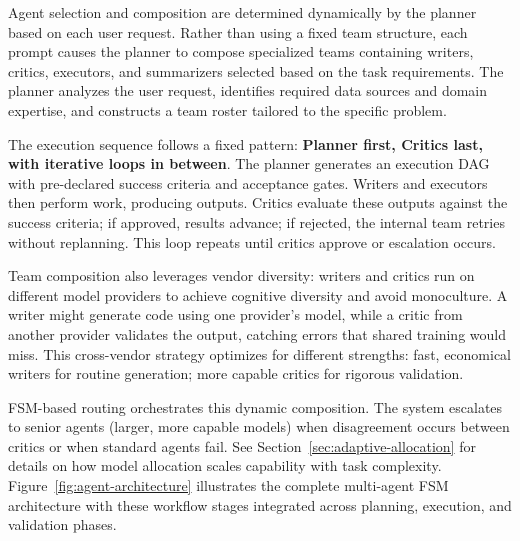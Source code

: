 \documentclass[sigconf]{acmart}
\newcommand{\reviewnote}[1]{}
\newcommand{\reviewnote}[1]{\marginnote{\raggedright\footnotesize\textit{#1}}}
\begin{document}
Agent selection and composition are determined dynamically by the planner based on each user request. Rather than using a fixed team structure, each prompt causes the planner to compose specialized teams containing writers, critics, executors, and summarizers selected based on the task requirements.\reviewnote{Interesting: show an example. How does the planner decide to spawn Python vs SQL vs Chart writers? Is this rule-based or learned? Current presentation is vague.} The planner analyzes the user request, identifies required data sources and domain expertise, and constructs a team roster tailored to the specific problem.

The execution sequence follows a fixed pattern: \textbf{Planner first, Critics last, with iterative loops in between}. The planner generates an execution DAG with pre-declared success criteria and acceptance gates. Writers and executors then perform work, producing outputs. Critics evaluate these outputs against the success criteria; if approved, results advance; if rejected, the internal team retries without replanning. This loop repeats until critics approve or escalation occurs.

Team composition also leverages vendor diversity: writers and critics run on different model providers to achieve cognitive diversity and avoid monoculture. A writer might generate code using one provider's model, while a critic from another provider validates the output, catching errors that shared training would miss. This cross-vendor strategy optimizes for different strengths: fast, economical writers for routine generation; more capable critics for rigorous validation.

FSM-based routing orchestrates this dynamic composition. The system escalates to senior agents (larger, more capable models) when disagreement occurs between critics or when standard agents fail. See Section~\ref{sec:adaptive-allocation} for details on how model allocation scales capability with task complexity.
Figure~\ref{fig:agent-architecture} illustrates the complete multi-agent FSM architecture with these workflow stages integrated across planning, execution, and validation phases.
\end{document}
